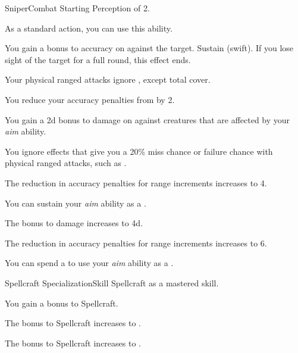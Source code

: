     \begin{feat}{Sniper}{Combat}
        \featpre Starting Perception of 2.
        \featben

         As a standard action, you can use this ability.
        \begin{ability}
            \begin{spelltargetinginfo}
            \end{spelltargetinginfo}
            \begin{spelleffects}
                \spelleffect You gain a  bonus to accuracy on  against the target.
                \spelldur Sustain (swift). If you lose sight of the target for a full round, this effect ends.
            \end{spelleffects}
        \end{ability}

         Your physical ranged attacks ignore , except total cover.

         You reduce your accuracy penalties from  by 2.

         You gain a \plus2d bonus to damage on  against \unaware creatures that are affected by your \textit{aim} ability.

         You ignore effects that give you a 20\% miss chance or failure chance with physical ranged attacks, such as .

         The reduction in accuracy penalties for range increments increases to 4.

         You can sustain your \textit{aim} ability as a .

         The bonus to damage increases to \plus4d.

         The reduction in accuracy penalties for range increments increases to 6.

         You can spend a  to use your \textit{aim} ability as a .
    \end{feat}

    \begin{feat}{Spellcraft Specialization}{Skill}
        \featpre Spellcraft as a mastered skill.
        \featben

         You gain a  bonus to Spellcraft.

         The bonus to Spellcraft increases to .

         The bonus to Spellcraft increases to .
    \end{feat}

